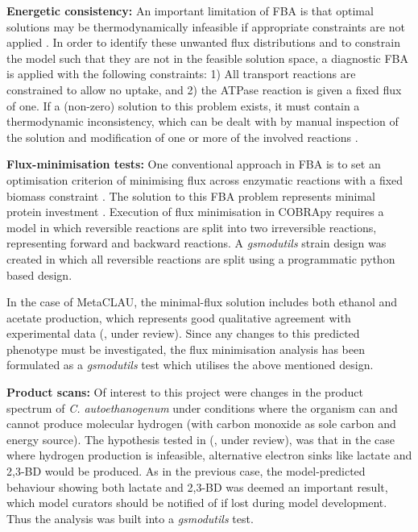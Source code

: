\documentclass[journal=asbcd6]{achemso}
\begin{document}
\textbf{Energetic consistency:} 
An important limitation of FBA is that optimal solutions may be thermodynamically infeasible if appropriate constraints are not applied \cite{Fell1197rohtua}.
In order to identify these unwanted flux distributions and to constrain the model such that they are not in the feasible solution space, a diagnostic FBA is applied with the following constraints:
1) All transport reactions are constrained to allow no uptake, and 2) the ATPase reaction is given a fixed flux of one.
If a (non-zero) solution to this problem exists, it must contain a thermodynamic inconsistency, which can be dealt with by manual inspection of the solution and modification of one or more of the involved reactions \cite{Fell1197rohtua}.
 
\textbf{Flux-minimisation tests:}
One conventional approach in FBA is to set an optimisation criterion of minimising flux across enzymatic reactions with a fixed biomass constraint \cite{holzhutter2006thegeneralised}. 
The solution to this FBA problem represents minimal protein investment \cite{holzhutter2006thegeneralised}.
Execution of flux minimisation in COBRApy requires a model in which reversible reactions are split into two irreversible reactions, representing forward and backward reactions.
A \textit{gsmodutils} strain design was created in which all reversible reactions are split using a programmatic python based design.

In the case of MetaCLAU, the minimal-flux solution includes both ethanol and acetate production, which represents good qualitative agreement with experimental data (\cite{norman2018progress}, under review).
Since any changes to this predicted phenotype must be investigated, the flux minimisation analysis has been formulated as a \textit{gsmodutils} test which utilises the above mentioned design.

\textbf{Product scans:}
Of interest to this project were changes in the product spectrum of \textit{C. autoethanogenum} under conditions where the organism can and cannot produce molecular hydrogen (with carbon monoxide as sole carbon and energy source).
The hypothesis tested in (\cite{norman2018progress}, under review), was that in the case where hydrogen production is infeasible, alternative electron sinks like lactate and 2,3-BD would be produced.
As in the previous case, the model-predicted behaviour showing both lactate and 2,3-BD was deemed an important result, which model curators should be notified of if lost during model development.
Thus the analysis was built into a \textit{gsmodutils} test.
\end{document}
